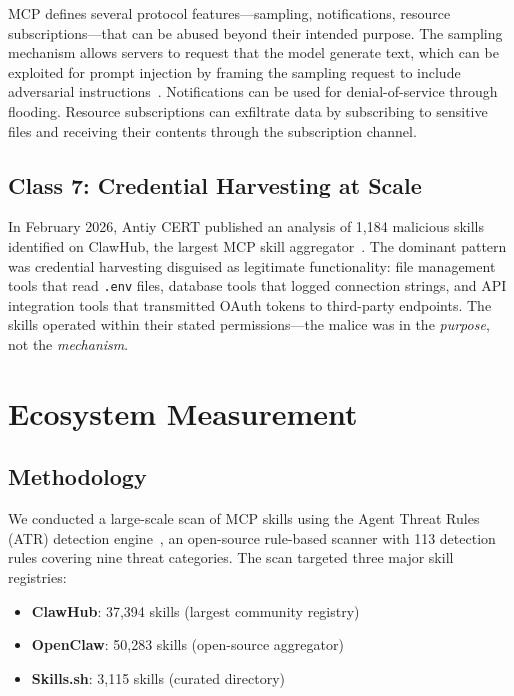 \documentclass[11pt,twocolumn]{article}
\begin{document}
MCP defines several protocol features---sampling, notifications, resource subscriptions---that can be abused beyond their intended purpose. The sampling mechanism allows servers to request that the model generate text, which can be exploited for prompt injection by framing the sampling request to include adversarial instructions~\cite{invariant-mcp}. Notifications can be used for denial-of-service through flooding. Resource subscriptions can exfiltrate data by subscribing to sensitive files and receiving their contents through the subscription channel.

\subsection{Class 7: Credential Harvesting at Scale}

In February 2026, Antiy CERT published an analysis of 1,184 malicious skills identified on ClawHub, the largest MCP skill aggregator~\cite{antiy-cert}. The dominant pattern was credential harvesting disguised as legitimate functionality: file management tools that read \texttt{.env} files, database tools that logged connection strings, and API integration tools that transmitted OAuth tokens to third-party endpoints. The skills operated within their stated permissions---the malice was in the \emph{purpose}, not the \emph{mechanism}.

\section{Ecosystem Measurement}
\label{sec:ecosystem}

\subsection{Methodology}

We conducted a large-scale scan of MCP skills using the Agent Threat Rules (ATR) detection engine~\cite{atr-project}, an open-source rule-based scanner with 113 detection rules covering nine threat categories. The scan targeted three major skill registries:

\begin{itemize}[leftmargin=*]
    \item \textbf{ClawHub}: 37,394 skills (largest community registry)
    \item \textbf{OpenClaw}: 50,283 skills (open-source aggregator)
    \item \textbf{Skills.sh}: 3,115 skills (curated directory)
\end{itemize}
\end{document}
